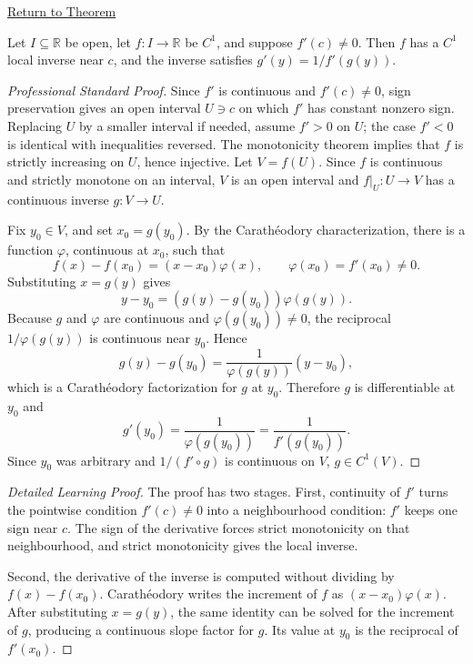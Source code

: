 \newpage
{}
\label{prf:inverse-function-theorem-one-variable}

\begin{remark*}[Return]
\hyperref[thm:inverse-function-theorem-one-variable]{Return to Theorem}
\end{remark*}

\begin{theorem*}
Let \(I\subseteq\mathbb{R}\) be open, let \(f:I\to\mathbb{R}\) be \(C^1\), and suppose \(f'(c)\neq 0\). Then \(f\) has a \(C^1\) local inverse near \(c\), and the inverse satisfies \(g'(y)=1/f'(g(y))\).
\end{theorem*}

\begin{proof}[Professional Standard Proof]
\LRAProofBodyStart
Since \(f'\) is continuous and \(f'(c)\neq 0\), sign preservation gives an open interval \(U\ni c\) on which \(f'\) has constant nonzero sign. Replacing \(U\) by a smaller interval if needed, assume \(f'>0\) on \(U\); the case \(f'<0\) is identical with inequalities reversed. The monotonicity theorem implies that \(f\) is strictly increasing on \(U\), hence injective. Let \(V=f(U)\). Since \(f\) is continuous and strictly monotone on an interval, \(V\) is an open interval and \(f|_U:U\to V\) has a continuous inverse \(g:V\to U\).

Fix \(y_0\in V\), and set \(x_0=g(y_0)\). By the Carath\'{e}odory characterization, there is a function \(\varphi\), continuous at \(x_0\), such that
\[
  f(x)-f(x_0)=(x-x_0)\varphi(x),
  \qquad
  \varphi(x_0)=f'(x_0)\neq 0.
\]
Substituting \(x=g(y)\) gives
\[
  y-y_0=(g(y)-g(y_0))\varphi(g(y)).
\]
Because \(g\) and \(\varphi\) are continuous and \(\varphi(g(y_0))\neq 0\), the reciprocal \(1/\varphi(g(y))\) is continuous near \(y_0\). Hence
\[
  g(y)-g(y_0)=\frac{1}{\varphi(g(y))}(y-y_0),
\]
which is a Carath\'{e}odory factorization for \(g\) at \(y_0\). Therefore \(g\) is differentiable at \(y_0\) and
\[
  g'(y_0)=\frac{1}{\varphi(g(y_0))}=\frac{1}{f'(g(y_0))}.
\]
Since \(y_0\) was arbitrary and \(1/(f'\circ g)\) is continuous on \(V\), \(g\in C^1(V)\).
\end{proof}

\begin{proof}[Detailed Learning Proof]
\LRAProofBodyStart
The proof has two stages. First, continuity of \(f'\) turns the pointwise condition \(f'(c)\neq 0\) into a neighbourhood condition: \(f'\) keeps one sign near \(c\). The sign of the derivative forces strict monotonicity on that neighbourhood, and strict monotonicity gives the local inverse.

Second, the derivative of the inverse is computed without dividing by \(f(x)-f(x_0)\). Carath\'{e}odory writes the increment of \(f\) as \((x-x_0)\varphi(x)\). After substituting \(x=g(y)\), the same identity can be solved for the increment of \(g\), producing a continuous slope factor for \(g\). Its value at \(y_0\) is the reciprocal of \(f'(x_0)\).
\end{proof}

